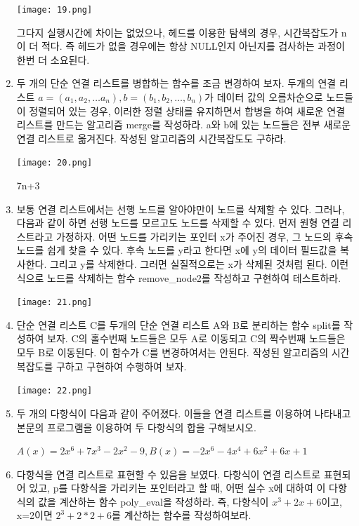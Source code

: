 \documentclass[11pt,a4paper]{article}
\begin{document}
\begin{enumerate}
\begin{enumerate}
\end{enumerate}

\texttt{[image: 19.png]}

그다지 실행시간에 차이는 없었으나, 헤드를 이용한 탐색의 경우, 시간복잡도가 n이 더 적다. 
즉 헤드가 없을 경우에는 항상 NULL인지 아닌지를 검사하는 과정이 한번 더 소요된다.
\item 두 개의 단순 연결 리스트를 병합하는 함수를 조금 변경하여 보자. 
두개의 연결 리스트 $a=(a_1, a_2,\dots a_n), b=(b_1, b_2, \dots, b_n)$가 데이터 값의 오름차순으로 노드들이 정렬되어 있는 경우, 이러한 정렬 상태를 유지하면서 합병을 하여 새로운 연결 리스트를 만드는 알고리즘 merge를 작성하라. 
a와 b에 있는 노드들은 전부 새로운 연결 리스트로 옮겨진다. 작성된 알고리즘의 시간복잡도도 구하라.

\texttt{[image: 20.png]}

7n+3

\item 보통 연결 리스트에서는 선행 노드를 알아야만이 노드를 삭제할 수 있다.
	그러나, 다음과 같이 하면 선행 노드를 모르고도 노드를 삭제할 수 있다. 
	먼저 원형 연결 리스트라고 가정하자. 
	어떤 노드를 가리키는 포인터 x가 주어진 경우, 그 노드의 후속 노드를 쉽게 찾을 수 있다.
	후속 노드를 y라고 한다면 x에 y의 데이터 필드값을 복사한다. 
	그리고 y를 삭제한다. 
	그러면 실질적으로는 x가 삭제된 것처럼 된다. 
	이런 식으로 노드를 삭제하는 함수 remove\_node2를 작성하고 구현하여 테스트하라.

\texttt{[image: 21.png]}

\item 단순 연결 리스트 C를 두개의 단순 연결 리스트 A와 B로 분리하는 함수 split를 작성하여 보자. C의 홀수번째 노드들은 모두 A로 이동되고 C의 짝수번째 노드들은 모두 B로 이동된다. 이 함수가 C를 변경하여서는 안된다. 작성된 알고리즘의 시간 복잡도를 구하고 구현하여 수행하여 보자.

\texttt{[image: 22.png]}

\item 두 개의 다항식이 다음과 같이 주어졌다. 이들을 연결 리스트를 이용하여 나타내고 본문의 프로그램을 이용하여 두 다항식의 합을 구해보시오.

$A(x)=2x^6+7x^3-2x^2-9, B(x)=-2x^6-4x^4+6x^2+6x+1$

\item 다항식을 연결 리스트로 표현할 수 있음을 보였다.
다항식이 연결 리스트로 표현되어 있고, p를 다항식을 가리키는 포인터라고 할 때, 어떤 실수 x에 대하여 이 다항식의 값을 계산하는 함수 poly\_eval을 작성하라.
즉, 다항식이 $x^3+2x+6$이고, x=2이면 $2^3+2*2+6$를 계산하는 함수를 작성하여보라.


\end{enumerate}
\end{document}
